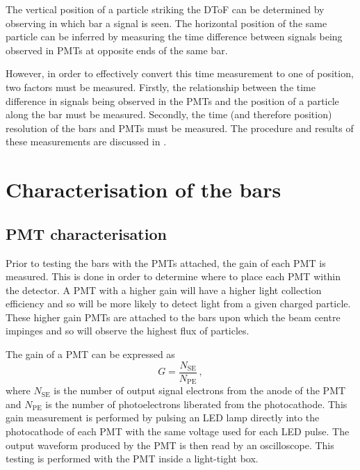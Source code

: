 The vertical position of a particle striking the DToF can be determined by observing in which bar a signal is seen.
The horizontal position of the same particle can be inferred by measuring the time difference between signals being observed in PMTs at opposite ends of the same bar.

However, in order to effectively convert this time measurement to one of position, two factors must be measured.
Firstly, the relationship between the time difference in signals being observed in the PMTs and the position of a particle along the bar must be measured.
Secondly, the time (and therefore position) resolution of the bars and PMTs must be measured.
The procedure and results of these measurements are discussed in .

\section{Characterisation of the bars}
\label{sec:hptpc_dtof_characterisation:characterisation}

\subsection{PMT characterisation}
\label{sec:hptpc_dtof_characterisation:characterisation:pmt}

Prior to testing the bars with the PMTs attached, the gain of each PMT is measured.
This is done in order to determine where to place each PMT within the detector.
A PMT with a higher gain will have a higher light collection efficiency and so will be more likely to detect light from a given charged particle.
These higher gain PMTs are attached to the bars upon which the beam centre impinges and so will observe the highest flux of particles.

The gain of a PMT can be expressed as
\begin{equation}
  G = \frac{N_{\text{SE}}}{N_{\text{PE}}} \, ,
\end{equation}
where $N_{\text{SE}}$ is the number of output signal electrons from the anode of the PMT and $N_{\text{PE}}$ is the number of photoelectrons liberated from the photocathode.
This gain measurement is performed by pulsing an LED lamp directly into the photocathode of each PMT with the same voltage used for each LED pulse.
The output waveform produced by the PMT is then read by an oscilloscope.
This testing is performed with the PMT inside a light-tight box.

